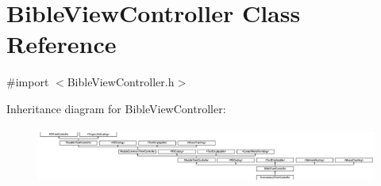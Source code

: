\hypertarget{interface_bible_view_controller}{\section{Bible\-View\-Controller Class Reference}
\label{interface_bible_view_controller}
}


{\ttfamily \#import $<$Bible\-View\-Controller.\-h$>$}

Inheritance diagram for Bible\-View\-Controller\-:\begin{figure}[H]
\begin{center}
\leavevmode
\includegraphics[height=1.866667cm]{interface_bible_view_controller}
\end{center}
\end{figure}
